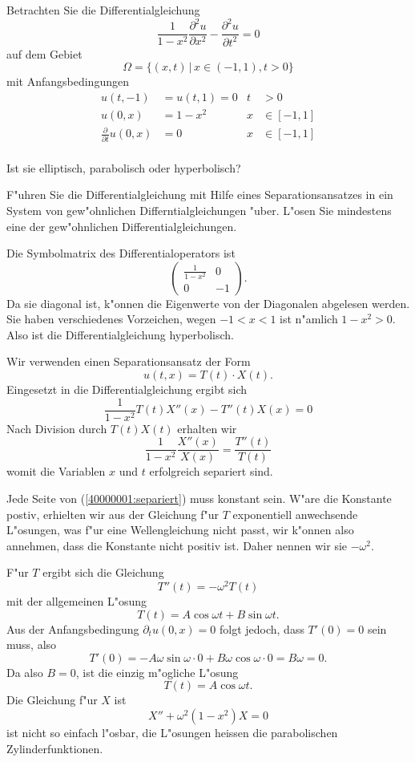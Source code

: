 Betrachten Sie die Differentialgleichung
\[
\frac1{1-x^2}\frac{\partial^2 u}{\partial x^2}
-
\frac{\partial^2 u}{\partial t^2}=0
\]
auf dem Gebiet
\[
\Omega=\{(x,t)\,|\, x\in (-1,1), t>0\}
\]
mit Anfangsbedingungen
\begin{align*}
u(t,-1)&=u(t,1)=0&t&>0\\
u(0,x)&=1-x^2&x&\in[-1,1]\\
\frac{\partial}{\partial t}u(0,x)&=0&x&\in[-1,1]\\
\end{align*}
\begin{teilaufgaben}
\item Ist sie elliptisch, parabolisch oder hyperbolisch?
\item F"uhren Sie die Differentialgleichung mit Hilfe eines
Separationsansatzes in ein System von gew"ohnlichen
Differntialgleichungen "uber. L"osen Sie mindestens eine der
gew"ohnlichen Differentialgleichungen.
\end{teilaufgaben}

\begin{loesung}
\begin{teilaufgaben}
\item
Die Symbolmatrix des Differentialoperators ist
\[
\begin{pmatrix}
\frac1{1-x^2}&0\\0&-1
\end{pmatrix}.
\]
Da sie diagonal ist, k"onnen die Eigenwerte von der Diagonalen
abgelesen werden. Sie haben verschiedenes Vorzeichen, wegen
$-1<x<1$ ist n"amlich $1-x^2>0$. Also ist die Differentialgleichung
hyperbolisch.
\item
Wir verwenden einen Separationsansatz der Form
\[
u(t,x)=T(t)\cdot X(t).
\]
Eingesetzt in die Differentialgleichung ergibt sich
\[
\frac1{1-x^2}T(t)X''(x)-T''(t)X(x)=0
\]
Nach Division durch $T(t)X(t)$ erhalten wir
\begin{equation}
\frac1{1-x^2}\frac{X''(x)}{X(x)}=\frac{T''(t)}{T(t)}
\label{40000001:separiert}
\end{equation}
womit die Variablen $x$ und $t$ erfolgreich separiert sind.

Jede Seite von (\ref{40000001:separiert}) muss konstant sein. W"are die
Konstante postiv, erhielten wir aus der Gleichung f"ur $T$ exponentiell
anwechsende L"osungen, was f"ur eine Wellengleichung nicht passt, wir
k"onnen also annehmen, dass die Konstante nicht positiv ist.
Daher nennen wir sie $-\omega^2$.

F"ur $T$ ergibt sich die Gleichung
\[
T''(t)=-\omega^2 T(t)
\]
mit der allgemeinen L"osung
\[
T(t)=A\cos\omega t+B\sin\omega t.
\]
Aus der Anfangsbedingung $\partial_t u(0,x)=0$ folgt jedoch, dass
$T'(0)=0$ sein muss, also
\[
T'(0)=-A\omega\sin\omega \cdot 0+B\omega\cos\omega\cdot 0=B\omega=0.
\]
Da also $B=0$, ist die einzig m"ogliche L"osung
\[
T(t)=A\cos\omega t.
\]
Die Gleichung f"ur $X$ ist
\[
X''+\omega^2(1-x^2)X=0
\]
ist nicht so einfach l"osbar, die L"osungen heissen die parabolischen
Zylinderfunktionen.
\end{teilaufgaben}
\end{loesung}

